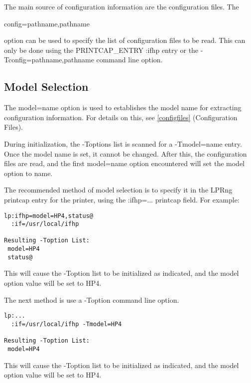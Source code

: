 \documentclass[a4paper]{article}
\begin{document}
The main source of configuration information are the configuration files.
The
\begin{tscreen}
config=pathname,pathname
\end{tscreen}

option can be used to specify the list of configuration files to be read.
This can only be done using the
{\ttfamily PRINTCAP\_ENTRY}
{\ttfamily :ifhp}
entry or the
{\ttfamily -Tconfig=pathname,pathname}
command line option.


\subsection{Model Selection
\label{modelselect}
\label{model}}

The
{\ttfamily model=name}
option is used to establishes the model name for extracting
configuration information.
For details on this, see
\ref{configfiles} {(Configuration Files)}.

During initialization,
the
{\ttfamily -Toptions}
list is scanned for a
{\ttfamily -Tmodel=name}
entry.
Once the model name is set, it cannot be changed.
After this,
the configuration files are read,
and the first
{\ttfamily model=name}
option encountered will set the
{\ttfamily model}
option to
{\ttfamily name}.

The recommended method of model selection is to
specify it in the
LPRng printcap entry for the printer,
using the {\ttfamily :ifhp=...}
printcap field.
For example:
\begin{tscreen}
\begin{verbatim}
lp:ifhp=model=HP4,status@
  :if=/usr/local/ifhp

Resulting -Toption List:
 model=HP4
 status@
\end{verbatim}
\end{tscreen}


This will cause the
{\ttfamily -Toption}
list to be initialized as indicated,
and the
{\ttfamily model}
option value will be set to
{\ttfamily HP4}.

The next method is use a
{\ttfamily -Toption}
command line option.
\begin{tscreen}
\begin{verbatim}
lp:...
  :if=/usr/local/ifhp -Tmodel=HP4

Resulting -Toption List:
 model=HP4
\end{verbatim}
\end{tscreen}


This will cause the
{\ttfamily -Toption}
list to be initialized as indicated,
and the
{\ttfamily model}
option value will be set to
{\ttfamily HP4}.
\end{document}
